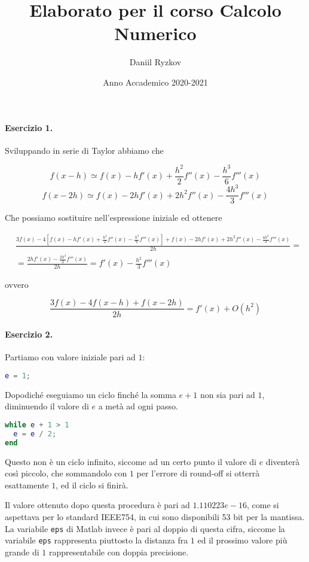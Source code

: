 \documentclass[12pt, a4paper]{article}
\title{Elaborato per il corso Calcolo Numerico}
\author{Daniil Ryzkov}
\date{Anno Accademico 2020-2021}
\begin{document}
\maketitle
\newpage

\paragraph{Esercizio 1.} Sviluppando in serie di Taylor abbiamo che

\[ f(x-h) \simeq f(x) - hf'(x) + \frac{h^2}{2}f''(x) - \frac{h^3}{6}f'''(x) \]
\[ f(x-2h) \simeq f(x) - 2hf'(x) + 2h^2f''(x) - \frac{4h^3}{3}f'''(x) \]

Che possiamo sostituire nell'espressione iniziale ed ottenere

\[
\begin{split}
& \frac{3f(x) - 4\left[f(x) - hf'(x) + \frac{h^2}{2}f''(x) - \frac{h^3}{6}f'''(x)\right] + f(x) - 2hf'(x) + 2h^2f''(x) - \frac{4h^3}{3}f'''(x)}{2h} =  \\
& = \frac{2hf'(x) - \frac{2h^3}{3}f'''(x)}{2h} = f'(x) - \frac{h^2}{3}f'''(x)
\end{split}
\]

ovvero

\[ \frac{3f(x) - 4f(x-h) + f(x-2h)}{2h} = f'(x) + O(h^2) \]

\paragraph{Esercizio 2.} Partiamo con valore iniziale pari ad $1$:

\begin{lstlisting}[language=Matlab]
e = 1;
\end{lstlisting}

Dopodiché eseguiamo un ciclo finché la somma $e+1$ non sia pari ad $1$, diminuendo il valore di $e$ a metà ad ogni passo.

\begin{lstlisting}[language=Matlab]
while e + 1 > 1
  e = e / 2;
end
\end{lstlisting}

Questo non è un ciclo infinito, siccome ad un certo punto il valore di $e$ diventerà così piccolo, che sommandolo con $1$ per l'errore di round-off si otterrà esattamente $1$, ed il ciclo si finirà.

Il valore ottenuto dopo questa procedura è pari ad $1.110223e-16$, come si aspettava per lo standard IEEE754, in cui sono disponibili 53 bit per la mantissa. La variabile \verb|eps| di Matlab invece è pari al doppio di questa cifra, siccome la variabile \verb|eps| rappresenta piuttosto la distanza fra $1$ ed il prossimo valore più grande di $1$ rappresentabile con doppia precisione.
\end{document}
